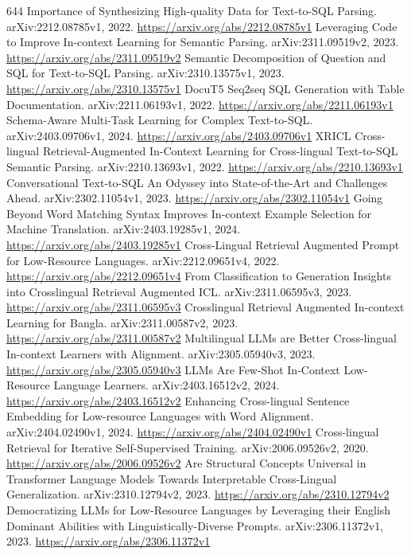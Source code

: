 \documentclass[11pt]{article}
\begin{document}
\begin{thebibliography}{644}
 Importance of Synthesizing High-quality Data for Text-to-SQL Parsing. arXiv:2212.08785v1, 2022. \url{https://arxiv.org/abs/2212.08785v1}
 Leveraging Code to Improve In-context Learning for Semantic Parsing. arXiv:2311.09519v2, 2023. \url{https://arxiv.org/abs/2311.09519v2}
 Semantic Decomposition of Question and SQL for Text-to-SQL Parsing. arXiv:2310.13575v1, 2023. \url{https://arxiv.org/abs/2310.13575v1}
 DocuT5 Seq2seq SQL Generation with Table Documentation. arXiv:2211.06193v1, 2022. \url{https://arxiv.org/abs/2211.06193v1}
 Schema-Aware Multi-Task Learning for Complex Text-to-SQL. arXiv:2403.09706v1, 2024. \url{https://arxiv.org/abs/2403.09706v1}
 XRICL Cross-lingual Retrieval-Augmented In-Context Learning for Cross-lingual Text-to-SQL Semantic Parsing. arXiv:2210.13693v1, 2022. \url{https://arxiv.org/abs/2210.13693v1}
 Conversational Text-to-SQL An Odyssey into State-of-the-Art and Challenges Ahead. arXiv:2302.11054v1, 2023. \url{https://arxiv.org/abs/2302.11054v1}
 Going Beyond Word Matching Syntax Improves In-context Example Selection for Machine Translation. arXiv:2403.19285v1, 2024. \url{https://arxiv.org/abs/2403.19285v1}
 Cross-Lingual Retrieval Augmented Prompt for Low-Resource Languages. arXiv:2212.09651v4, 2022. \url{https://arxiv.org/abs/2212.09651v4}
 From Classification to Generation Insights into Crosslingual Retrieval Augmented ICL. arXiv:2311.06595v3, 2023. \url{https://arxiv.org/abs/2311.06595v3}
 Crosslingual Retrieval Augmented In-context Learning for Bangla. arXiv:2311.00587v2, 2023. \url{https://arxiv.org/abs/2311.00587v2}
 Multilingual LLMs are Better Cross-lingual In-context Learners with Alignment. arXiv:2305.05940v3, 2023. \url{https://arxiv.org/abs/2305.05940v3}
 LLMs Are Few-Shot In-Context Low-Resource Language Learners. arXiv:2403.16512v2, 2024. \url{https://arxiv.org/abs/2403.16512v2}
 Enhancing Cross-lingual Sentence Embedding for Low-resource Languages with Word Alignment. arXiv:2404.02490v1, 2024. \url{https://arxiv.org/abs/2404.02490v1}
 Cross-lingual Retrieval for Iterative Self-Supervised Training. arXiv:2006.09526v2, 2020. \url{https://arxiv.org/abs/2006.09526v2}
 Are Structural Concepts Universal in Transformer Language Models Towards Interpretable Cross-Lingual Generalization. arXiv:2310.12794v2, 2023. \url{https://arxiv.org/abs/2310.12794v2}
 Democratizing LLMs for Low-Resource Languages by Leveraging their English Dominant Abilities with Linguistically-Diverse Prompts. arXiv:2306.11372v1, 2023. \url{https://arxiv.org/abs/2306.11372v1}

\end{thebibliography}
\end{document}
